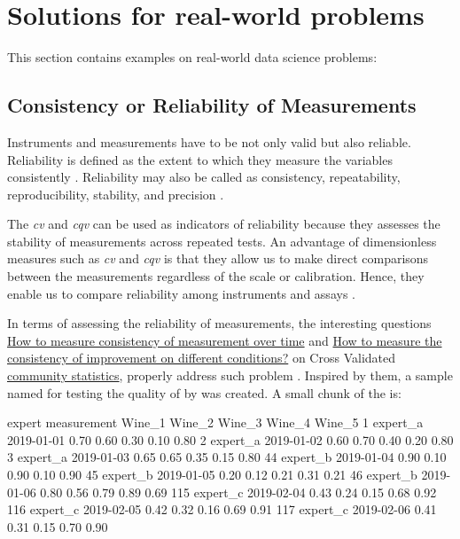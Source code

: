 \section{Solutions for real-world problems}

This section contains examples on real-world data science problems: 


\subsection{Consistency or Reliability of Measurements}

Instruments and measurements have to be not only valid but also reliable. 
Reliability is defined as the extent to which they measure the variables consistently \citep{Shechtman_2013}. Reliability may also be called as consistency, repeatability, reproducibility, stability, and precision \citep{Shechtman_2013}.

The \emph{cv} and \emph{cqv} can be used as indicators of reliability because they assesses the stability of measurements across repeated tests. An advantage of dimensionless measures such as \emph{cv} and \emph{cqv} is that they allow us to make direct comparisons between the measurements regardless of the scale or calibration. Hence, they enable us to compare reliability among instruments and assays \citep{Shechtman_2013, hopkins_2000}.

In terms of assessing the reliability of measurements, the interesting questions  \href{https://stats.stackexchange.com/questions/318044/how-to-measure-consistency-of-measurement-over-time}{How to measure consistency of measurement over time} and  \href{https://stats.stackexchange.com/questions/398462/how-to-measure-the-consistency-of-improvement-on-different-conditions}{How to measure the consistency of improvement on different conditions?} on Cross Validated  \href{https://stats.stackexchange.com/}{community statistics}, properly address such problem \citep{tach_2017, Ida_2019}. Inspired by them, a sample  named  for testing the quality of  by  was created. A small chunk of the  is:

\begin{example}
     expert    measurement Wine_1 Wine_2 Wine_3 Wine_4 Wine_5
1    expert_a  2019-01-01   0.70   0.60   0.30   0.10   0.80
2    expert_a  2019-01-02   0.60   0.70   0.40   0.20   0.80
3    expert_a  2019-01-03   0.65   0.65   0.35   0.15   0.80
44   expert_b  2019-01-04   0.90   0.10   0.90   0.10   0.90
45   expert_b  2019-01-05   0.20   0.12   0.21   0.31   0.21
46   expert_b  2019-01-06   0.80   0.56   0.79   0.89   0.69
115  expert_c  2019-02-04   0.43   0.24   0.15   0.68   0.92
116  expert_c  2019-02-05   0.42   0.32   0.16   0.69   0.91
117  expert_c  2019-02-06   0.41   0.31   0.15   0.70   0.90
\end{example}


